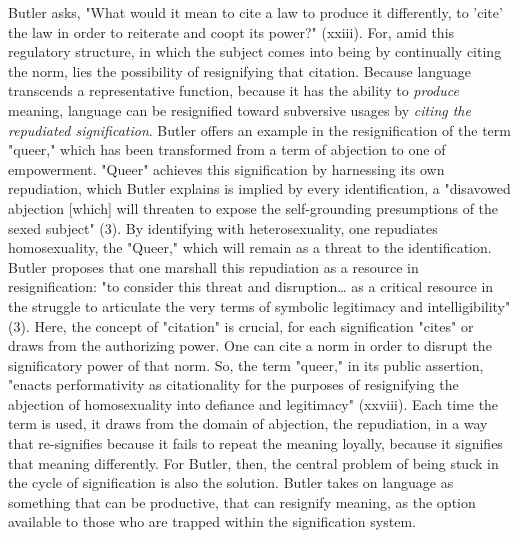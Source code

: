 \documentclass[11pt]{article}
\begin{document}
Butler asks, "What would it mean to cite a law to produce it
differently, to 'cite' the law in order to reiterate and coopt its
power?" (xxiii). For, amid this regulatory structure, in which the
subject comes into being by continually citing the norm, lies the
possibility of resignifying that citation. Because language transcends
a representative function, because it has the ability to \emph{produce}
meaning, language can be resignified toward subversive usages by
\emph{citing the repudiated signification}. Butler offers an example in the
resignification of the term "queer," which has been transformed from a
term of abjection to one of empowerment. "Queer" achieves this
signification by harnessing its own repudiation, which Butler explains
is implied by every identification, a "disavowed abjection [which]
will threaten to expose the self-grounding presumptions of the sexed
subject" (3). By identifying with heterosexuality, one repudiates
homosexuality, the "Queer," which will remain as a threat to the
identification. Butler proposes that one marshall this repudiation as
a resource in resignification: "to consider this threat and
disruption\ldots{} as a critical resource in the struggle to articulate the
very terms of symbolic legitimacy and intelligibility" (3). Here, the
concept of "citation" is crucial, for each signification "cites" or
draws from the authorizing power. One can cite a norm in order to
disrupt the significatory power of that norm. So, the term "queer," in
its public assertion, "enacts performativity as citationality for the
purposes of resignifying the abjection of homosexuality into defiance
and legitimacy" (xxviii). Each time the term is used, it draws from
the domain of abjection, the repudiation, in a way that re-signifies
because it fails to repeat the meaning loyally, because it signifies
that meaning differently. For Butler, then, the central problem of
being stuck in the cycle of signification is also the solution. Butler
takes on language as something that can be productive, that can
resignify meaning, as the option available to those who are trapped
within the signification system.
\end{document}
